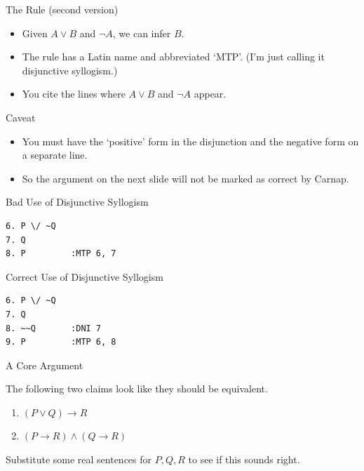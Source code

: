 \documentclass[
  ignorenonframetext,
]{beamer}
\providecommand{\tightlist}{%
  \setlength{\itemsep}{0pt}\setlength{\parskip}{0pt}}
\renewcommand{\,}{\text{, }}
\begin{document}
\begin{frame}{The Rule (second version)}
\protect\hypertarget{the-rule-second-version}{}

\begin{itemize}
\tightlist
\item
  Given \(A \vee B\) and \(\neg A\), we can infer \(B\).
\item
  The rule has a Latin name and abbreviated `MTP'. (I'm just calling it
  disjunctive syllogism.)
\item
  You cite the lines where \(A \vee B\) and \(\neg A\) appear.
\end{itemize}

\end{frame}

\begin{frame}{Caveat}
\protect\hypertarget{caveat}{}

\begin{itemize}
\tightlist
\item
  You must have the `positive' form in the disjunction and the negative
  form on a separate line.
\item
  So the argument on the next slide will not be marked as correct by
  Carnap.
\end{itemize}

\end{frame}

\begin{frame}[fragile]{Bad Use of Disjunctive Syllogism}
\protect\hypertarget{bad-use-of-disjunctive-syllogism}{}

\begin{verbatim}
6. P \/ ~Q
7. Q
8. P         :MTP 6, 7
\end{verbatim}

\end{frame}

\begin{frame}[fragile]{Correct Use of Disjunctive Syllogism}
\protect\hypertarget{correct-use-of-disjunctive-syllogism}{}

\begin{verbatim}
6. P \/ ~Q
7. Q
8. ~~Q       :DNI 7
9. P         :MTP 6, 8
\end{verbatim}

\end{frame}

\begin{frame}{A Core Argument}
\protect\hypertarget{a-core-argument}{}

The following two claims look like they should be equivalent.

\begin{enumerate}
\tightlist
\item
  \((P \vee Q) \rightarrow R\)
\item
  \((P \rightarrow R) \wedge (Q \rightarrow R)\)
\end{enumerate}

Substitute some real sentences for \(P, Q, R\) to see if this sounds
right.

\end{frame}
\end{document}
